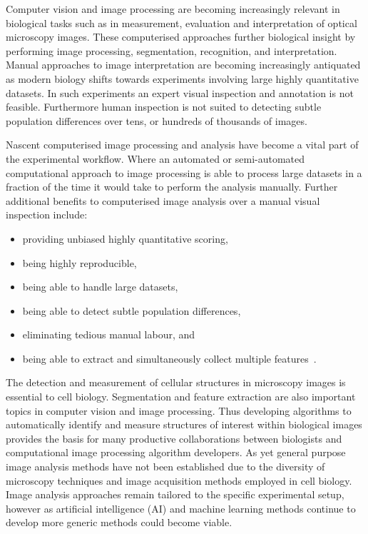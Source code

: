 Computer vision and image processing are becoming increasingly relevant in biological tasks such as in measurement, evaluation and interpretation of optical microscopy images. These computerised approaches further biological insight by performing image processing, segmentation, recognition, and interpretation. Manual approaches to image interpretation are becoming increasingly antiquated as modern biology shifts towards experiments involving large highly quantitative datasets. In such experiments an expert visual inspection and annotation is not feasible. Furthermore human inspection is not suited to detecting subtle population differences over tens, or hundreds of thousands of images.

Nascent computerised image processing and analysis have become a vital part of the experimental workflow. Where an automated or semi-automated computational approach to image processing is able to process large datasets in a fraction of the time it would take to perform the analysis manually. Further additional benefits to computerised image analysis over a manual visual inspection include:
\begin{itemize}
\item providing unbiased highly quantitative scoring,
\item being highly reproducible,
\item being able to handle large datasets,
\item being able to detect subtle population differences,
\item eliminating tedious manual labour, and
\item being able to extract and simultaneously collect multiple features~\cite{Jones2006}.
\end{itemize}

The detection and measurement of cellular structures in microscopy images is essential to cell biology. Segmentation and feature extraction are also important topics in computer vision and image processing. Thus developing algorithms to automatically identify and measure structures of interest within biological images provides the basis for many productive collaborations between biologists and computational image processing algorithm developers. As yet general purpose image analysis methods have not been established due to the diversity of microscopy techniques and image acquisition methods employed in cell biology. Image analysis approaches remain tailored to the specific experimental setup, however as artificial intelligence (AI) and machine learning methods continue to develop more generic methods could become viable.

